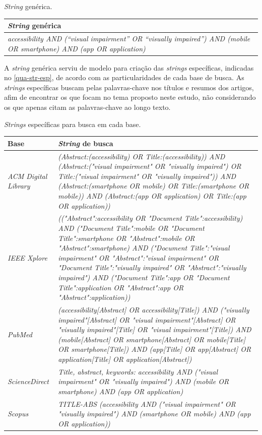 \begin{quadro}[htb]
\caption{\label{qua-str-gen}\emph{String} genérica.}
\begin{tabular}{|m{11.5cm}|}
    \hline
    \textbf{\emph{String} genérica} \\
    \hline
    \emph{accessibility AND (“visual impairment” OR “visually impaired”) AND (mobile OR smartphone) AND (app OR application)} \\ \hline
\end{tabular}
\end{quadro}

A \emph{string} genérica serviu de modelo para criação das \emph{strings} específicas, indicadas no \autoref{qua-str-esp}, de acordo com as particularidades de cada base de busca.
As \emph{strings} específicas buscam pelas palavras-chave nos títulos e resumos dos artigos, afim de encontrar os que focam no tema proposto neste estudo, não considerando os que apenas citam as palavras-chave ao longo texto.

\begin{quadro}[htb]
\caption{\label{qua-str-esp}\emph{Strings} específicas para busca em cada base.}
\begin{tabular}{|m{3.5cm} | m{11.5cm}|}
   \hline
   \textbf{Base} & \textbf{\emph{String} de busca} \\ \hline
    \emph{ACM Digital Library} & \emph{(Abstract:(accessibility) OR Title:(accessibility)) AND (Abstract:("visual impairment" OR "visually impaired") OR Title:("visual impairment" OR "visually impaired")) AND (Abstract:(smartphone OR mobile) OR Title:(smartphone OR mobile)) AND (Abstract:(app OR application) OR Title:(app OR application))} \\ \hline
    \emph{IEEE Xplore} & \emph{(("Abstract":accessibility OR "Document Title":accessibility) AND ("Document Title":mobile OR "Document Title":smartphone OR "Abstract":mobile OR "Abstract":smartphone) AND ("Document Title":"visual impairment" OR "Abstract":"visual impairment" OR "Document Title":"visually impaired" OR "Abstract":"visually impaired") AND ("Document Title":app OR "Document Title":application OR "Abstract":app OR "Abstract":application))} \\ \hline
    \emph{PubMed} & \emph{(accessibility[Abstract] OR accessibility[Title]) AND ("visually impaired"[Abstract] OR "visual impairment"[Abstract] OR "visually impaired"[Title] OR "visual impairment"[Title]) AND (mobile[Abstract] OR smartphone[Abstract] OR mobile[Title] OR smartphone[Title]) AND (app[Title] OR app[Abstract] OR application[Title] OR application[Abstract])} \\ \hline
    \emph{ScienceDirect} & \emph{Title, abstract, keywords: accessibility AND ("visual impairment" OR "visually impaired") AND (mobile OR smartphone) AND (app OR application)} \\ \hline
    \emph{Scopus} & \emph{TITLE-ABS (accessibility AND ("visual impairment" OR "visually impaired") AND (smartphone OR mobile) AND (app OR application))} \\ \hline
\end{tabular}
\end{quadro}

